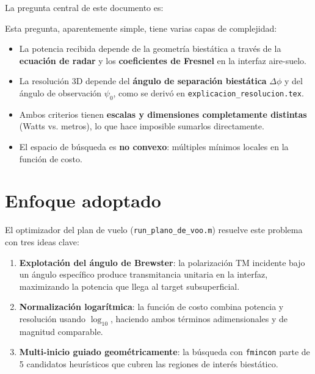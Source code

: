 \documentclass[12pt,a4paper,oneside]{book}
\begin{document}
La pregunta central de este documento es:

\begin{center}
\end{center}

Esta pregunta, aparentemente simple, tiene varias capas de complejidad:

\begin{itemize}
  \item La potencia recibida depende de la geometría biestática a través de la \textbf{ecuación de radar} y los \textbf{coeficientes de Fresnel} en la interfaz aire-suelo.
  \item La resolución 3D depende del \textbf{ángulo de separación biestática} $\Delta\phi$ y del ángulo de observación $\psi_0$, como se derivó en \texttt{explicacion\_resolucion.tex}.
  \item Ambos criterios tienen \textbf{escalas y dimensiones completamente distintas} (Watts vs. metros), lo que hace imposible sumarlos directamente.
  \item El espacio de búsqueda es \textbf{no convexo}: múltiples mínimos locales en la función de costo.
\end{itemize}

\section{Enfoque adoptado}

El optimizador del plan de vuelo (\texttt{run\_plano\_de\_voo.m}) resuelve este problema con tres ideas clave:

\begin{enumerate}
  \item \textbf{Explotación del ángulo de Brewster}: la polarización TM incidente bajo un ángulo específico produce transmitancia unitaria en la interfaz, maximizando la potencia que llega al target subsuperficial.
  \item \textbf{Normalización logarítmica}: la función de costo combina potencia y resolución usando $\log_{10}$, haciendo ambos términos adimensionales y de magnitud comparable.
  \item \textbf{Multi-inicio guiado geométricamente}: la búsqueda con \texttt{fmincon} parte de 5 candidatos heurísticos que cubren las regiones de interés biestático.
\end{enumerate}
\end{document}

